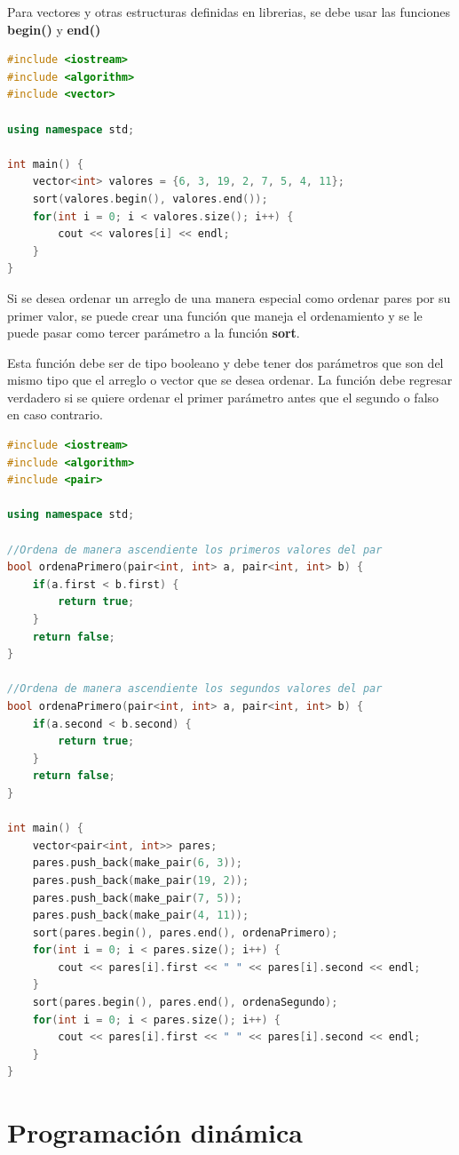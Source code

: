 \documentclass{article}
\begin{document}
Para vectores y otras estructuras definidas en librerias, se debe usar las funciones \textbf{begin()} y \textbf{end()}

\begin{lstlisting}[language=C++, title=Ordenamiento estandar para un vector]
#include <iostream>
#include <algorithm>
#include <vector>

using namespace std;

int main() {
	vector<int> valores = {6, 3, 19, 2, 7, 5, 4, 11};
	sort(valores.begin(), valores.end());
	for(int i = 0; i < valores.size(); i++) {
		cout << valores[i] << endl;
	}
}
\end{lstlisting}

Si se desea ordenar un arreglo de una manera especial como ordenar pares por su primer valor, se puede crear una función que maneja el ordenamiento y se le puede pasar como tercer parámetro a la función \textbf{sort}.

Esta función debe ser de tipo booleano y debe tener dos parámetros que son del mismo tipo que el arreglo o vector que se desea ordenar. La función debe regresar verdadero si se quiere ordenar el primer parámetro antes que el segundo o falso en caso contrario.

\begin{lstlisting}[language=C++, title=Ordenamiento estandar sobrecargada]
#include <iostream>
#include <algorithm>
#include <pair>

using namespace std;

//Ordena de manera ascendiente los primeros valores del par
bool ordenaPrimero(pair<int, int> a, pair<int, int> b) {
	if(a.first < b.first) {
		return true;
	}
	return false;
}

//Ordena de manera ascendiente los segundos valores del par
bool ordenaPrimero(pair<int, int> a, pair<int, int> b) {
	if(a.second < b.second) {
		return true;
	}
	return false;
}

int main() {
	vector<pair<int, int>> pares;
	pares.push_back(make_pair(6, 3));
	pares.push_back(make_pair(19, 2));
	pares.push_back(make_pair(7, 5));
	pares.push_back(make_pair(4, 11));
	sort(pares.begin(), pares.end(), ordenaPrimero);
	for(int i = 0; i < pares.size(); i++) {
		cout << pares[i].first << " " << pares[i].second << endl;
	}
	sort(pares.begin(), pares.end(), ordenaSegundo);
	for(int i = 0; i < pares.size(); i++) {
		cout << pares[i].first << " " << pares[i].second << endl;
	}
}
\end{lstlisting}

\section{Programación dinámica}
\end{document}
